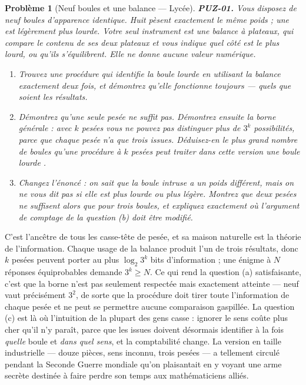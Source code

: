 \documentclass[11pt]{article}
\newtheorem{problem}{Problème}
\begin{document}
\begin{problem}[{Neuf boules et une balance --- Lycée}]
\textbf{PUZ-01.} Vous disposez de neuf boules d'apparence identique. Huit pèsent
exactement le même poids ; une est légèrement plus lourde. Votre seul instrument est une
balance à plateaux, qui compare le contenu de ses deux plateaux et vous indique quel côté
est le plus lourd, ou qu'ils s'équilibrent. Elle ne donne aucune valeur numérique.
\begin{enumerate}
\item[(a)] Trouvez une procédure qui identifie la boule lourde en utilisant la balance exactement
deux fois, et démontrez qu'elle fonctionne toujours --- quels que soient les résultats.
\item[(b)] Démontrez qu'une seule pesée ne suffit pas. Démontrez ensuite la borne générale : avec
$ k $ pesées vous ne pouvez pas distinguer plus de $ 3^{k} $ possibilités, parce que
chaque pesée n'a que trois issues. Déduisez-en le plus grand nombre de boules qu'une
procédure à $ k $ pesées peut traiter dans cette version \og{} une boule lourde \fg{}.
\item[(c)] Changez l'énoncé : on sait que la boule intruse a un poids différent, mais on ne vous
dit \textit{pas} si elle est plus lourde ou plus légère. Montrez que deux pesées ne
suffisent alors que pour trois boules, et expliquez exactement où l'argument de comptage
de la question (b) doit être modifié.
\end{enumerate}

\end{problem}

\noindent C'est l'ancêtre de tous les casse-tête de pesée, et sa maison naturelle
est la théorie de l'information. Chaque usage de la balance produit l'un de trois
résultats, donc $ k $ pesées peuvent porter au plus $ \log_2 3^k $ bits d'information ;
une énigme à $ N $ réponses équiprobables demande $ 3^k \geq N $. Ce qui rend la
question (a) satisfaisante, c'est que la borne n'est pas seulement respectée mais
exactement atteinte --- neuf vaut précisément $ 3^2 $, de sorte que la procédure doit tirer
toute l'information de chaque pesée et ne peut se permettre aucune comparaison gaspillée.
La question (c) est là où l'intuition de la plupart des gens casse : ignorer le sens coûte
plus cher qu'il n'y paraît, parce que les issues doivent désormais identifier à la fois
\textit{quelle} boule et \textit{dans quel sens}, et la comptabilité change. La version en
taille industrielle --- douze pièces, sens inconnu, trois pesées --- a tellement circulé
pendant la Seconde Guerre mondiale qu'on plaisantait en y voyant une arme secrète destinée
à faire perdre son temps aux mathématiciens alliés.
\end{document}

